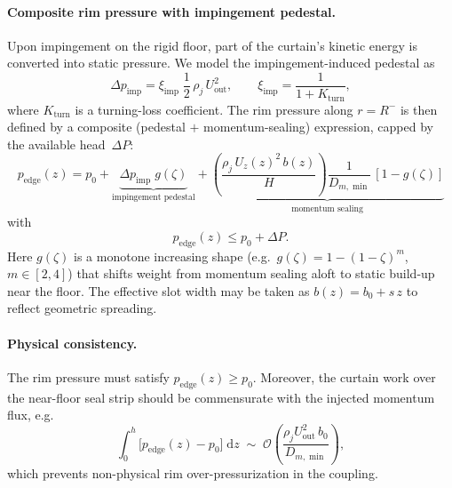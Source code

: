\documentclass[11pt,a4paper]{article}
\begin{document}
\paragraph*{Composite rim pressure with impingement pedestal.}
Upon impingement on the rigid floor, part of the curtain's kinetic energy is converted into static pressure. 
We model the impingement-induced pedestal as
\begin{equation}
  \Delta p_{\mathrm{imp}}=\xi_{\mathrm{imp}}\;\frac{1}{2}\,\rho_j\,U_{\mathrm{out}}^2,
  \qquad 
  \xi_{\mathrm{imp}}=\frac{1}{1+K_{\mathrm{turn}}},
  \label{eq:delta_p_imp}
\end{equation}
where $K_{\mathrm{turn}}$ is a turning-loss coefficient. 
The rim pressure along $r=R^{-}$ is then defined by a composite (pedestal $+$ momentum-sealing) expression, capped by the available head~$\Delta P$:
\begin{equation}
  p_{\mathrm{edge}}(z)=p_0 
  + \underbrace{\Delta p_{\mathrm{imp}}\;g(\zeta)}_{\text{impingement pedestal}}
  + \underbrace{\left(\frac{\rho_j\,U_z(z)^2\,b(z)}{H}\right)\frac{1}{D_{m,\min}}\,[1-g(\zeta)]}_{\text{momentum sealing}}
\end{equation}
with
\begin{equation}
  p_{\mathrm{edge}}(z)\le p_0+\Delta P.
  \label{eq:pedestal_composite}
\end{equation}
Here $g(\zeta)$ is a monotone increasing shape (e.g.\ $g(\zeta)=1-(1-\zeta)^m$, $m\in[2,4]$) that shifts weight from momentum sealing aloft to static build-up near the floor. 
The effective slot width may be taken as $b(z)=b_0 + s\,z$ to reflect geometric spreading.

\paragraph*{Physical consistency.}
The rim pressure must satisfy $p_{\mathrm{edge}}(z)\ge p_0$. Moreover, the curtain work over the near-floor seal strip should be commensurate with the injected momentum flux, e.g.
\begin{equation}
\int_{0}^{h}\!\big[p_{\mathrm{edge}}(z)-p_0\big]\;\mathrm{d}z
\;\sim\; \mathcal{O}\!\left(\frac{\rho_j U_{\mathrm{out}}^2\,b_0}{D_{m,\min}}\right),
\end{equation}
which prevents non-physical rim over-pressurization in the coupling.
\end{document}

